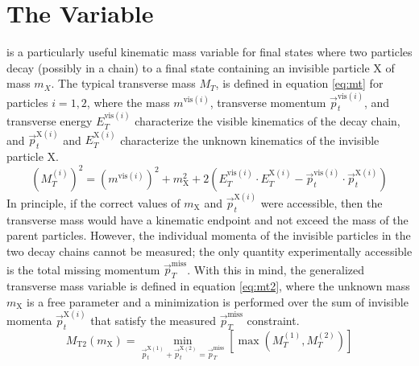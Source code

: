 \section{The \mttwo Variable}
\label{sec:mt2}
\mttwo is a particularly useful kinematic mass variable for final states where two particles decay (possibly in a chain) to a final state containing an invisible particle X of mass $m_X$. The typical transverse mass $M_T$, is defined in equation \ref{eq:mt} for particles $i=1,2$, where the mass $m^{\text{vis}(i)}$, transverse momentum $\vec{p}_t^{\text{vis}(i)}$, and transverse energy $E_T^{\text{vis}(i)}$ characterize the visible kinematics of the decay chain, and $\vec{p}_t^{\text{X}(i)}$ and $E_T^{\text{X}(i)}$ characterize the unknown kinematics of the invisible particle X.
\begin{equation}
	(M_T^{(i)})^2 = (m^{\text{vis}(i)})^2 + m_{\text{X}}^2+2\left(E_T^{\text{vis}(i)} \cdot E_T^{\text{X}(i)} - \vec{p}_t^{\text{vis}(i)} \cdot \vec{p}_t^{\text{X}(i)} \right)
	\label{eq:mt}
\end{equation}
In principle, if the correct values of $m_{\text{X}}$ and $\vec{p}_t^{\text{X}(i)}$ were accessible, then the transverse mass would have a kinematic endpoint and not exceed the mass of the parent particles. However, the individual momenta of the invisible particles in the two decay chains cannot be measured; the only quantity experimentally accessible is the total missing momentum $\vec{p}_T^{\text{miss}}$. With this in mind, the generalized transverse mass variable \mttwo is defined in equation \ref{eq:mt2}, where the unknown mass $m_{\text{X}}$ is a free parameter and a minimization is performed over the sum of invisible momenta $\vec{p}_t^{\text{X}(i)}$ that satisfy the measured $\vec{p}_T^{\text{miss}}$ constraint.
\begin{equation}
	M_{\text{T2}}(m_{\text{X}}) = \min_{\vec{p}_t^{\text{X}(1)}+\vec{p}_t^{\text{X}(2)}=\vec{p}_T^{\text{miss}}} \left[\max \left( M_T^{(1)},M_T^{(2)} \right) \right]
	\label{eq:mt2}
\end{equation}

